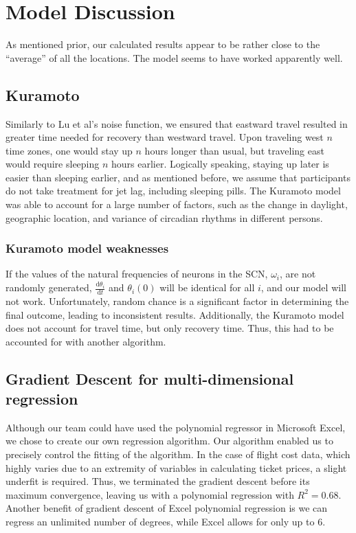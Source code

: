 \section{Model Discussion}
As mentioned prior, our calculated results appear to be rather close to the ``average'' of all the locations. The model seems to have worked apparently well.


\subsection{Kuramoto}
Similarly to Lu et al's noise function, we ensured that eastward travel resulted in greater time needed for recovery than westward travel. Upon traveling west $n$ time zones, one would stay up $n$ hours longer than usual, but traveling east would require sleeping $n$ hours earlier. Logically speaking, staying up later is easier than sleeping earlier, and as mentioned before, we assume that participants do not take treatment for jet lag, including sleeping pills. The Kuramoto model was able to account for a large number of factors, such as the change in daylight, geographic location, and variance of circadian rhythms in different persons. 


\subsubsection*{Kuramoto model weaknesses}
If the values of the natural frequencies of neurons in the SCN, $\omega_i$, are not randomly generated, $\frac{\mathrm{d} \theta_i}{\mathrm{d} t}$ and $\theta_i(0)$ will be identical for all $i$, and our model will not work. Unfortunately, random chance is a significant factor in determining the final outcome, leading to inconsistent results. Additionally, the Kuramoto model does not account for travel time, but only recovery time. Thus, this had to be accounted for with another algorithm.


\subsection{Gradient Descent for multi-dimensional regression}
Although our team could have used the polynomial regressor in Microsoft Excel, we chose to create our own regression algorithm. Our algorithm enabled us to precisely control the fitting of the algorithm. In the case of flight cost data, which highly varies due to an extremity of variables in calculating ticket prices, a slight underfit is required. Thus, we terminated the gradient descent before its maximum convergence, leaving us with a polynomial regression with $R^2 = 0.68$. Another benefit of gradient descent of Excel polynomial regression is we can regress an unlimited number of degrees, while Excel allows for only up to 6. 


